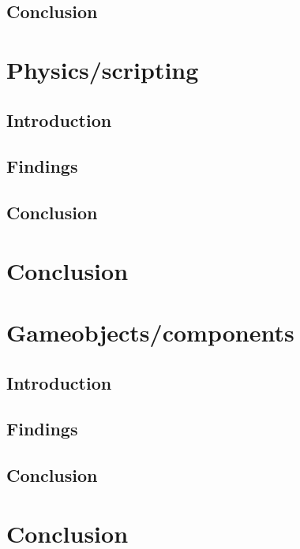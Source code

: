 \documentclass{projdoc}
\begin{document}
    \subsection{Conclusion}
\section{Physics/scripting}
    \subsection{Introduction}
    \subsection{Findings}
    \subsection{Conclusion}
\section{Conclusion}
\section{Gameobjects/components}
    \subsection{Introduction}
    \subsection{Findings}
    \subsection{Conclusion}
\section{Conclusion}
\end{document}
